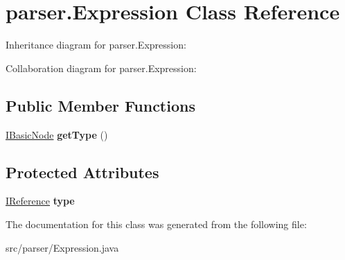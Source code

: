 \hypertarget{classparser_1_1_expression}{}\section{parser.\+Expression Class Reference}
\label{classparser_1_1_expression}


Inheritance diagram for parser.\+Expression\+:


Collaboration diagram for parser.\+Expression\+:
\subsection*{Public Member Functions}
\begin{DoxyCompactItemize}
\item 
\hyperlink{interfaceparser_1_1_i_basic_node}{I\+Basic\+Node} {\bfseries get\+Type} ()\hypertarget{classparser_1_1_expression_ac0b8c226296d0882feebbcf15686a6b5}{}\label{classparser_1_1_expression_ac0b8c226296d0882feebbcf15686a6b5}

\end{DoxyCompactItemize}
\subsection*{Protected Attributes}
\begin{DoxyCompactItemize}
\item 
\hyperlink{interfaceparser_1_1_i_reference}{I\+Reference} {\bfseries type}\hypertarget{classparser_1_1_expression_ab1c3da0dc9790897ddfdb39ba5411440}{}\label{classparser_1_1_expression_ab1c3da0dc9790897ddfdb39ba5411440}

\end{DoxyCompactItemize}


The documentation for this class was generated from the following file\+:\begin{DoxyCompactItemize}
\item 
src/parser/Expression.\+java\end{DoxyCompactItemize}

